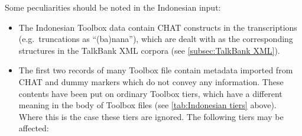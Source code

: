 \documentclass[a4paper, 11pt]{book}
\begin{document}
\noindent Some peculiarities should be noted in the Indonesian input: 

\begin{itemize}
	\item The Indonesian Toolbox data contain CHAT constructs in the transcriptions (e.g.\ truncations as “(ba)nana”), 
		which are dealt with as the corresponding structures in the TalkBank XML corpora (see \autoref{subsec:TalkBank XML}).
		
		
	\item The first two records of many Toolbox file contain metadata imported from CHAT and dummy markers which do not convey any
		information. These contents have been put on ordinary Toolbox tiers, which have a different meaning in the body of Toolbox files 
		(see \autoref{tab:Indonesian tiers} above). Where this is the case these tiers are ignored. The following tiers may be affected: 
		

\end{itemize}
\end{document}
